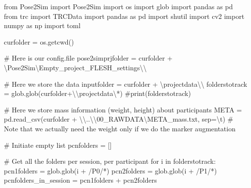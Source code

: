 \documentclass[
  letterpaper,
  DIV=11,
  numbers=noendperiod]{scrreprt}
\newenvironment{Shaded}{\begin{snugshade}}{\end{snugshade}}
\newcommand{\CharTok}[1]{\textcolor[rgb]{0.13,0.47,0.30}{#1}}
\newcommand{\CommentTok}[1]{\textcolor[rgb]{0.37,0.37,0.37}{#1}}
\newcommand{\ControlFlowTok}[1]{\textcolor[rgb]{0.00,0.23,0.31}{#1}}
\newcommand{\ImportTok}[1]{\textcolor[rgb]{0.00,0.46,0.62}{#1}}
\newcommand{\KeywordTok}[1]{\textcolor[rgb]{0.00,0.23,0.31}{#1}}
\newcommand{\NormalTok}[1]{\textcolor[rgb]{0.00,0.23,0.31}{#1}}
\newcommand{\OperatorTok}[1]{\textcolor[rgb]{0.37,0.37,0.37}{#1}}
\newcommand{\StringTok}[1]{\textcolor[rgb]{0.13,0.47,0.30}{#1}}
\begin{document}
\begin{Shaded}
\begin{Highlighting}[]
\ImportTok{from}\NormalTok{ Pose2Sim }\ImportTok{import}\NormalTok{ Pose2Sim}
\ImportTok{import}\NormalTok{ os}
\ImportTok{import}\NormalTok{ glob}
\ImportTok{import}\NormalTok{ pandas }\ImportTok{as}\NormalTok{ pd}
\ImportTok{from}\NormalTok{ trc }\ImportTok{import}\NormalTok{ TRCData}
\ImportTok{import}\NormalTok{ pandas }\ImportTok{as}\NormalTok{ pd}
\ImportTok{import}\NormalTok{ shutil}
\ImportTok{import}\NormalTok{ cv2}
\ImportTok{import}\NormalTok{ numpy }\ImportTok{as}\NormalTok{ np}
\ImportTok{import}\NormalTok{ toml}

\NormalTok{curfolder }\OperatorTok{=}\NormalTok{ os.getcwd()}

\CommentTok{\# Here is our config.file}
\NormalTok{pose2simprjfolder }\OperatorTok{=}\NormalTok{ curfolder }\OperatorTok{+} \StringTok{\textquotesingle{}\textbackslash{}Pose2Sim\textbackslash{}Empty\_project\_FLESH\_settings}\CharTok{\textbackslash{}\textbackslash{}}\StringTok{\textquotesingle{}}

\CommentTok{\# Here we store the data}
\NormalTok{inputfolder }\OperatorTok{=}\NormalTok{ curfolder }\OperatorTok{+} \StringTok{\textquotesingle{}\textbackslash{}projectdata}\CharTok{\textbackslash{}\textbackslash{}}\StringTok{\textquotesingle{}}
\NormalTok{folderstotrack }\OperatorTok{=}\NormalTok{ glob.glob(curfolder}\OperatorTok{+}\StringTok{\textquotesingle{}}\CharTok{\textbackslash{}\textbackslash{}}\StringTok{projectdata\textbackslash{}*\textquotesingle{}}\NormalTok{)}
\CommentTok{\#print(folderstotrack)}

\CommentTok{\# Here we store mass information (weight, height) about participants}
\NormalTok{META }\OperatorTok{=}\NormalTok{ pd.read\_csv(curfolder }\OperatorTok{+} \StringTok{\textquotesingle{}}\CharTok{\textbackslash{}\textbackslash{}}\StringTok{..}\CharTok{\textbackslash{}\textbackslash{}}\StringTok{00\_RAWDATA\textbackslash{}META\_mass.txt\textquotesingle{}}\NormalTok{, sep}\OperatorTok{=}\StringTok{\textquotesingle{}}\CharTok{\textbackslash{}t}\StringTok{\textquotesingle{}}\NormalTok{) }\CommentTok{\# Note that we actually need the weight only if we do the marker augmentation}

\CommentTok{\# Initiate empty list}
\NormalTok{pcnfolders }\OperatorTok{=}\NormalTok{ []}

\CommentTok{\# Get all the folders per session, per participant}
\ControlFlowTok{for}\NormalTok{ i }\KeywordTok{in}\NormalTok{ folderstotrack:}
\NormalTok{    pcn1folders }\OperatorTok{=}\NormalTok{ glob.glob(i }\OperatorTok{+} \StringTok{\textquotesingle{}/P0/*\textquotesingle{}}\NormalTok{)}
\NormalTok{    pcn2folders }\OperatorTok{=}\NormalTok{ glob.glob(i }\OperatorTok{+} \StringTok{\textquotesingle{}/P1/*\textquotesingle{}}\NormalTok{)}
\NormalTok{    pcnfolders\_in\_session }\OperatorTok{=}\NormalTok{ pcn1folders }\OperatorTok{+}\NormalTok{ pcn2folders}


\end{Highlighting}
\end{Shaded}
\end{document}
